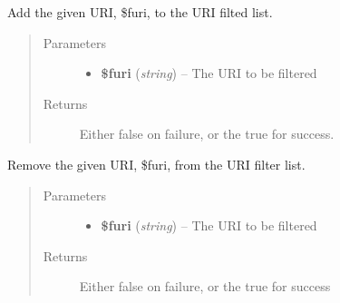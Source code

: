 \documentclass[letterpaper,10pt,english]{sphinxmanual}
\begin{document}
\begin{fulllineitems}
\begin{fulllineitems}
\end{fulllineitems}


\begin{fulllineitems}
\label{docs/api:Extractor::addFilteredUri}
Add the given URI, \$furi, to the URI filted list.
\begin{quote}\begin{description}
\item[{Parameters}] \leavevmode\begin{itemize}
\item {} 
\textbf{\$furi} (\emph{string}) -- The URI to be filtered

\end{itemize}

\item[{Returns}] \leavevmode
Either false on failure, or the true for success.

\end{description}\end{quote}

\end{fulllineitems}


\begin{fulllineitems}
\label{docs/api:Extractor::removeFilteredUri}
Remove the given URI, \$furi, from the URI filter list.
\begin{quote}\begin{description}
\item[{Parameters}] \leavevmode\begin{itemize}
\item {} 
\textbf{\$furi} (\emph{string}) -- The URI to be filtered

\end{itemize}

\item[{Returns}] \leavevmode
Either false on failure, or the true for success

\end{description}\end{quote}

\end{fulllineitems}


\end{fulllineitems}
\end{document}
